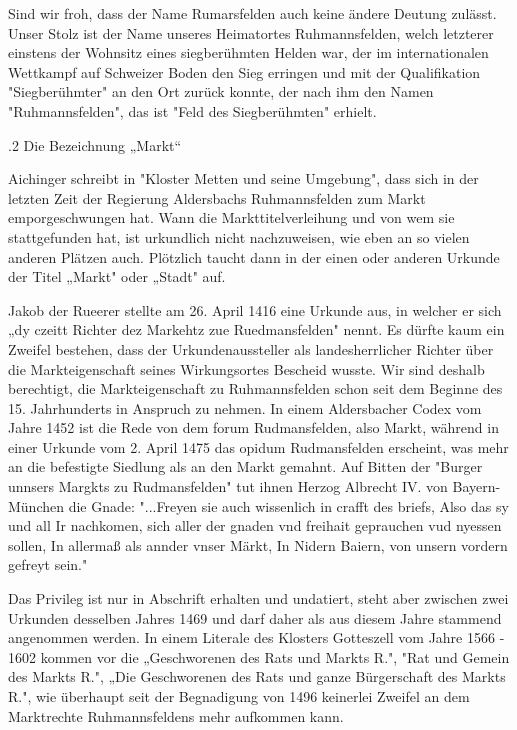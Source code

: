 \documentclass{book}
\begin{document}
Sind wir froh, dass der Name Rumarsfelden auch keine ändere Deutung zulässt.
Unser Stolz ist der Name unseres Heimatortes Ruhmannsfelden, welch letzterer
einstens der Wohnsitz eines siegberühmten Helden war, der im internationalen
Wettkampf auf Schweizer Boden den Sieg erringen und mit der Qualifikation
"Siegberühmter" an den Ort zurück konnte, der nach ihm den Namen
"Ruhmannsfelden", das ist "Feld des Siegberühmten" erhielt.



.2 Die Bezeichnung „Markt“

Aichinger schreibt in "Kloster Metten und seine Umgebung", dass sich in der
letzten Zeit der Regierung Aldersbachs Ruhmannsfelden zum Markt emporgeschwungen
hat. Wann die Markttitelverleihung und von wem sie stattgefunden hat, ist
urkundlich nicht nachzuweisen, wie eben an so vielen anderen Plätzen auch.
Plötzlich taucht dann in der einen oder anderen Urkunde der Titel „Markt" oder
„Stadt" auf.

Jakob der Rueerer stellte am 26. April 1416 eine Urkunde aus, in welcher er sich
„dy czeitt Richter dez Markehtz zue Ruedmansfelden" nennt. Es dürfte kaum ein
Zweifel bestehen, dass der Urkundenaussteller als landesherrlicher Richter über
die Markteigenschaft seines Wirkungsortes Bescheid wusste. Wir sind deshalb
berechtigt, die Markteigenschaft zu Ruhmannsfelden schon seit dem Beginne des
15. Jahrhunderts in Anspruch zu nehmen. In einem Aldersbacher Codex vom Jahre
1452 ist die Rede von dem forum Rudmansfelden, also Markt, während in einer
Urkunde vom 2. April 1475 das opidum Rudmansfelden erscheint, was mehr an die
befestigte Siedlung als an den Markt gemahnt. Auf Bitten der "Burger unnsers
Margkts zu Rudmansfelden" tut ihnen Herzog Albrecht IV. von Bayern-München die
Gnade: "...Freyen sie auch wissenlich in crafft des briefs, Also das sy und all
Ir nachkomen, sich aller der gnaden vnd freihait geprauchen vud nyessen sollen,
In allermaß als annder vnser Märkt, In Nidern Baiern, von unsern vordern gefreyt
sein."

Das Privileg ist nur in Abschrift erhalten und undatiert, steht aber zwischen
zwei Urkunden desselben Jahres 1469 und darf daher als aus diesem Jahre stammend
angenommen werden. In einem Literale des Klosters Gotteszell vom Jahre 1566 -
1602 kommen vor die „Geschworenen des Rats und Markts R.", "Rat und Gemein des
Markts R.", „Die Geschworenen des Rats und ganze Bürgerschaft des Markts R.",
wie überhaupt seit der Begnadigung von 1496 keinerlei Zweifel an dem Marktrechte
Ruhmannsfeldens mehr aufkommen kann.
\end{document}
